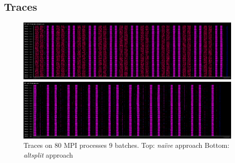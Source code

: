 \subsection{Traces}
\begin{figure}[H]
    \centerline{\includegraphics[scale=0.30]{altsplit/figs/baseline_trace.png}}
    \centerline{\includegraphics[scale=0.30]{altsplit/figs/altsplit_trace.png}}
    \caption{Traces on 80 MPI processes 9 batches. Top: \emph{na\"{i}ve} approach Bottom: \emph{altsplit} approach}
    \label{fig:altsplit_traces}
\end{figure}
